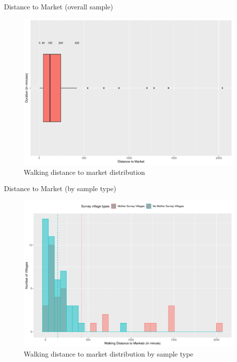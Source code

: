 \documentclass[
  ignorenonframetext,
]{beamer}
\begin{document}
\begin{frame}{Distance to Market (overall sample)}
\protect\hypertarget{markets}{}
\begin{figure}
\includegraphics[width=1\linewidth]{example_plots_files/figure-beamer/unnamed-chunk-13-1} \caption{Walking distance to market distribution}\label{fig:unnamed-chunk-13}
\end{figure}
\end{frame}

\begin{frame}{Distance to Market (by sample type)}
\protect\hypertarget{distance-to-market-by-sample-type}{}
\begin{figure}
\includegraphics[width=1\linewidth]{example_plots_files/figure-beamer/unnamed-chunk-14-1} \caption{Walking distance to market distribution by sample type}\label{fig:unnamed-chunk-14}
\end{figure}
\end{frame}
\end{document}
